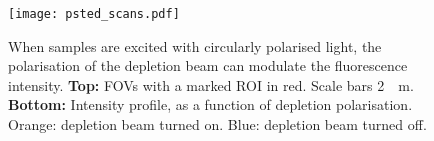 \begin{figure}
	\centering
	\texttt{[image: psted\_scans.pdf]}
	\caption{
		When samples are excited with circularly polarised light, the polarisation of the depletion beam can modulate the fluorescence intensity. \textbf{Top:} FOVs with a marked ROI in red. Scale bars \SI{2}{\mu m}. \textbf{Bottom:} Intensity profile, as a function of depletion polarisation. Orange: depletion beam turned on. Blue: depletion beam turned off.
	}
	\label{fig:psted scans}
\end{figure}




























